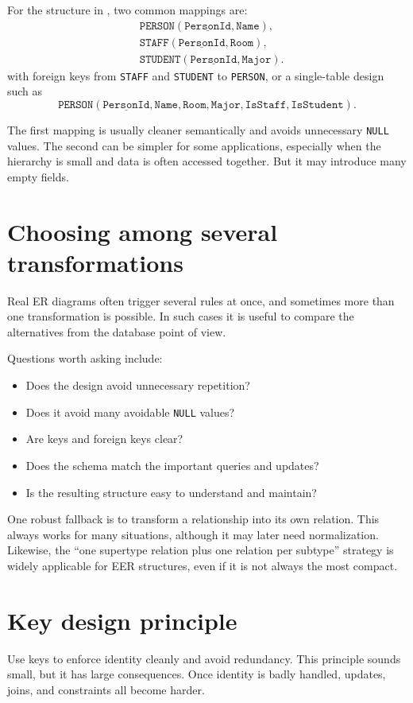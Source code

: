 \documentclass[11pt,a4paper,openany]{book}
\begin{document}
For the structure in , two common mappings are:
\[
\begin{aligned}
&\texttt{PERSON}(\underline{\texttt{PersonId}}, \texttt{Name}),\\
&\texttt{STAFF}(\underline{\texttt{PersonId}}, \texttt{Room}),\\
&\texttt{STUDENT}(\underline{\texttt{PersonId}}, \texttt{Major}).
\end{aligned}
\]
with foreign keys from \texttt{STAFF} and \texttt{STUDENT} to \texttt{PERSON},
or a single-table design such as
\[
\texttt{PERSON}(\underline{\texttt{PersonId}}, \texttt{Name}, \texttt{Room}, \texttt{Major}, \texttt{IsStaff}, \texttt{IsStudent}).
\]

The first mapping is usually cleaner semantically and avoids unnecessary \texttt{NULL} values. The second can be simpler for some applications, especially when the hierarchy is small and data is often accessed together. But it may introduce many empty fields.

\section{Choosing among several transformations}
Real ER diagrams often trigger several rules at once, and sometimes more than one transformation is possible. In such cases it is useful to compare the alternatives from the database point of view.

Questions worth asking include:
\begin{itemize}
\item Does the design avoid unnecessary repetition?
\item Does it avoid many avoidable \texttt{NULL} values?
\item Are keys and foreign keys clear?
\item Does the schema match the important queries and updates?
\item Is the resulting structure easy to understand and maintain?
\end{itemize}

One robust fallback is to transform a relationship into its own relation. This always works for many situations, although it may later need normalization. Likewise, the ``one supertype relation plus one relation per subtype'' strategy is widely applicable for EER structures, even if it is not always the most compact.

\section{Key design principle}
Use keys to enforce identity cleanly and avoid redundancy. This principle sounds small, but it has large consequences. Once identity is badly handled, updates, joins, and constraints all become harder.
\end{document}
